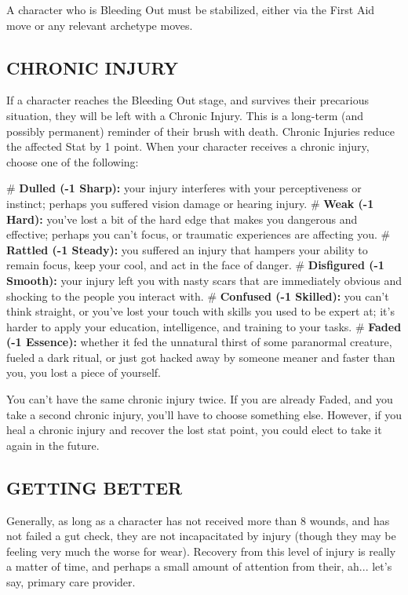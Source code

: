 A character who is Bleeding Out must be stabilized, either via the First Aid move or any relevant archetype moves.


\subsection*{CHRONIC INJURY}
If a character reaches the Bleeding Out stage, and survives their precarious situation, they will be left with a Chronic Injury. This is a long-term (and possibly permanent) reminder of their brush with death. Chronic Injuries reduce the affected Stat by 1 point. When your character receives a chronic injury, choose one of the following:

    \begin{easylist}
        # \textbf{Dulled (-1 Sharp):} your injury interferes with your perceptiveness or instinct; perhaps you suffered vision damage or hearing injury.        
        # \textbf{Weak (-1 Hard):} you’ve lost a bit of the hard edge that makes you dangerous and effective; perhaps you can’t focus, or traumatic experiences are affecting you.        
        # \textbf{Rattled (-1 Steady):} you suffered an injury that hampers your ability to remain focus, keep your cool, and act in the face of danger.        
        # \textbf{Disfigured (-1 Smooth):} your injury left you with nasty scars that are immediately obvious and shocking to the people you interact with.        
        # \textbf{Confused (-1 Skilled):} you can’t think straight, or you’ve lost your touch with skills you used to be expert at; it’s harder to apply your education, intelligence, and training to your tasks.        
        # \textbf{Faded (-1 Essence):} whether it fed the unnatural thirst of some paranormal creature, fueled a dark ritual, or just got hacked away by someone meaner and faster than you, you lost a piece of yourself.
    \end{easylist}
        
You can’t have the same chronic injury twice. If you are already Faded, and you take a second chronic injury, you’ll have to choose something else. However, if you heal a chronic injury and recover the lost stat point, you could elect to take it again in the future.


\subsection*{GETTING BETTER}
Generally, as long as a character has not received more than 8 wounds, and has not failed a gut check, they are not incapacitated by injury (though they may be feeling very much the worse for wear). Recovery from this level of injury is really a matter of time, and perhaps a small amount of attention from their, ah... let’s say, primary care provider.

